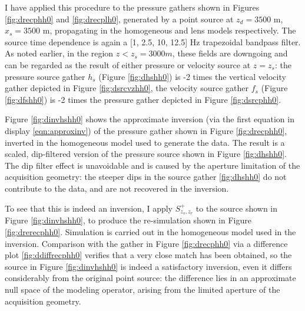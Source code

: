 I have applied this procedure to the pressure gathers shown in Figures
\ref{fig:drecphh0} and \ref{fig:drecplh0}, generated by a point source
at $z_d=3500$ m, $x_s=3500$ m, propagating in the homogeneous and lens
models respectively. The source time dependence is again a [1, 2.5,
10, 12.5] Hz trapezoidal bandpass filter. As noted earlier, in the
region $z < z_s=3000 m$, these fields are downgoing and can be
regarded as the result of either pressure or velocity source at $z=z_s$: the
pressure source gather $h_s$ (Figure \ref{fig:dhshh0})  is -2 times the
vertical velocity gather depicted in Figure \ref{fig:dsrcvzhh0}, the
velocity source gather $f_s$ (Figure \ref{fig:dfshh0}) is -2 times the
pressure gather depicted in Figure \ref{fig:dsrcphh0}.

Figure \ref{fig:dinvhshh0} shows the approximate inversion (via the
first equation in display \ref{eqn:approxinv}) of the
pressure gather shown in Figure \ref{fig:drecphh0}, inverted in the homogeneous model
used to generate the data. The result is a scaled, dip-filtered
version of the pressure source shown in Figure \ref{fig:dhshh0}.
The dip filter effect is unavoidable and is caused by the aperture
limitation of the acquisition geometry: the steeper dips in the source
gather \ref{fig:dhshh0} do not contribute to the data, and are not
recovered in the inversion.

To see that this is indeed an inversion, I apply $S^{+}_{z_s,z_r}$ to
the source shown in Figure \ref{fig:dinvhshh0}, to produce the
re-simulation shown in Figure \ref{fig:drerecphh0}. Simulation is carried
out in the homogeneous model used in the inversion. Comparison with the
gather in Figure \ref{fig:drecphh0} via a difference plot
\ref{fig:ddiffrecphh0} verifies that a very close match has been
obtained, so the source in Figure \ref{fig:dinvhshh0} is indeed a
satisfactory inversion, even it differs considerably from the original
point source: the difference lies in an approximate null space of the modeling
operator, arising from the limited aperture of the acquisition
geometry.

